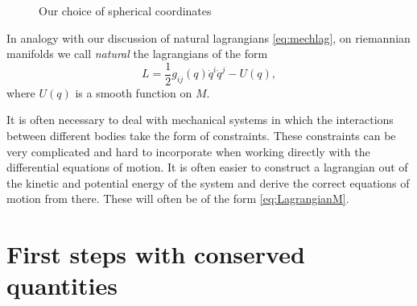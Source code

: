 \documentclass[english,fontsize=11pt,paper=a5,oneside]{scrbook}
\theoremstyle{definition}
\newenvironment{remark}
  {\pushQED{\qed}\renewcommand{\qedsymbol}{$\lozenge$}\remarkx}
  {\popQED\endremarkx}
\begin{document}
\begin{figure}[ht]
    \centering
    \label{fig:sphcoords}
    \caption{Our choice of spherical coordinates}
\end{figure}

In analogy with our discussion of natural lagrangians \eqref{eq:mechlag}, on riemannian manifolds we call \emph{natural} the lagrangians of the form
\begin{equation}\label{eq:LagrangianM}
    L = \frac 12 g_{ij}(q)\dot q^i \dot q^j - U(q),
\end{equation}
where $U(q)$ is a smooth function on $M$.

\begin{remark}
    It  is  often  necessary  to  deal  with  mechanical  systems  in  which the interactions between different bodies take the form of constraints.
    These constraints can  be  very  complicated  and  hard  to  incorporate  when  working directly  with  the differential  equations  of  motion.
    It  is  often  easier  to  construct  a  lagrangian out of the kinetic and potential energy of the system and derive the correct equations of motion from there.
    These will often be of the form \eqref{eq:LagrangianM}.
\end{remark}

\section{First steps with conserved quantities}
\end{document}
